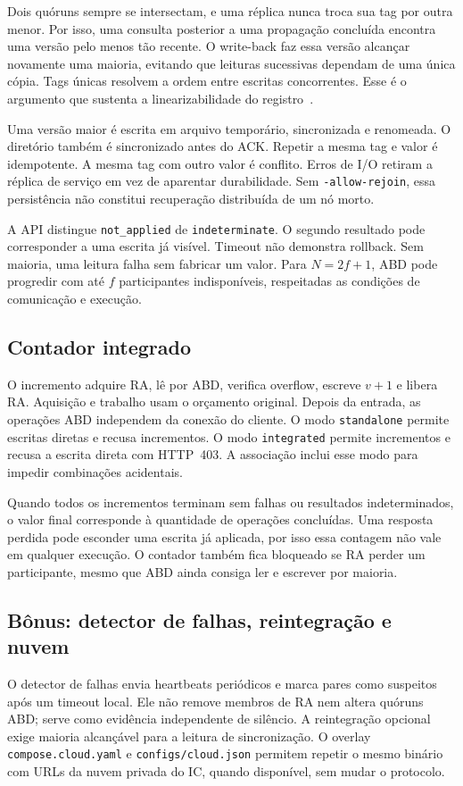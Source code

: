 \documentclass[conference]{IEEEtran}
\begin{document}
Dois quóruns sempre se intersectam, e uma réplica nunca troca sua tag por outra menor. Por isso, uma consulta posterior a uma propagação concluída encontra uma versão pelo menos tão recente. O write-back faz essa versão alcançar novamente uma maioria, evitando que leituras sucessivas dependam de uma única cópia. Tags únicas resolvem a ordem entre escritas concorrentes. Esse é o argumento que sustenta a linearizabilidade do registro~\cite{abd,mwmr,linearizability}.

Uma versão maior é escrita em arquivo temporário, sincronizada e renomeada. O diretório também é sincronizado antes do ACK. Repetir a mesma tag e valor é idempotente. A mesma tag com outro valor é conflito. Erros de I/O retiram a réplica de serviço em vez de aparentar durabilidade. Sem \texttt{-allow-rejoin}, essa persistência não constitui recuperação distribuída de um nó morto.

A API distingue \texttt{not\_applied} de \texttt{indeterminate}. O segundo resultado pode corresponder a uma escrita já visível. Timeout não demonstra rollback. Sem maioria, uma leitura falha sem fabricar um valor. Para $N=2f+1$, ABD pode progredir com até $f$ participantes indisponíveis, respeitadas as condições de comunicação e execução.

\subsection{Contador integrado}
O incremento adquire RA, lê por ABD, verifica overflow, escreve $v+1$ e libera RA. Aquisição e trabalho usam o orçamento original. Depois da entrada, as operações ABD independem da conexão do cliente. O modo \texttt{standalone} permite escritas diretas e recusa incrementos. O modo \texttt{integrated} permite incrementos e recusa a escrita direta com HTTP~403. A associação inclui esse modo para impedir combinações acidentais.

Quando todos os incrementos terminam sem falhas ou resultados indeterminados, o valor final corresponde à quantidade de operações concluídas. Uma resposta perdida pode esconder uma escrita já aplicada, por isso essa contagem não vale em qualquer execução. O contador também fica bloqueado se RA perder um participante, mesmo que ABD ainda consiga ler e escrever por maioria.

\subsection{Bônus: detector de falhas, reintegração e nuvem}
O detector de falhas envia heartbeats periódicos e marca pares como suspeitos após um timeout local. Ele não remove membros de RA nem altera quóruns ABD; serve como evidência independente de silêncio. A reintegração opcional exige maioria alcançável para a leitura de sincronização. O overlay \texttt{compose.cloud.yaml} e \texttt{configs/cloud.json} permitem repetir o mesmo binário com URLs da nuvem privada do IC, quando disponível, sem mudar o protocolo.
\end{document}
